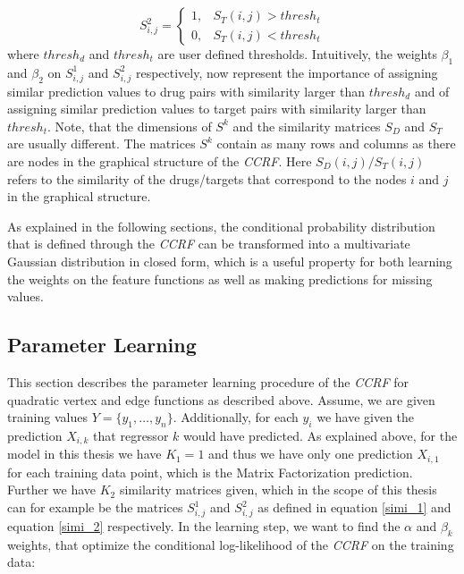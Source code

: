 \begin{equation}
\label{simi_2}
S_{i,j}^2 =
\begin{cases}
1, & S_T(i,j) > thresh_t \\
0, & S_T(i,j) < thresh_t
\end{cases} 
\end{equation}
where $thresh_d$ and $thresh_t$ are user defined thresholds. Intuitively, the weights $\beta_1$ and $\beta_2$ on $S_{i,j}^1$ and  $S_{i,j}^2$ respectively, now represent the importance of assigning similar prediction values to drug pairs with similarity larger than $thresh_d$ and of assigning similar prediction values to target pairs with similarity larger than $thresh_t$. Note, that the dimensions of $S^k$ and the similarity matrices $S_D$ and $S_T$ are usually different. The matrices $S^k$ contain as many rows and columns as there are nodes in the graphical structure of the \textit{CCRF}. Here $S_D(i,j)/S_T(i,j)$ refers to the similarity of the drugs/targets that correspond to the nodes $i$ and $j$ in the graphical structure.

As explained in the following sections, the conditional probability distribution that is defined through the \textit{CCRF} can be transformed into a multivariate Gaussian distribution in closed form, which is a useful property for both learning the weights on the feature functions as well as making predictions for missing values.
\subsection{Parameter Learning}

This section describes the parameter learning procedure of the \textit{CCRF} for quadratic vertex and edge functions as described above. Assume, we are given training values $Y=\{y_1,\dots,y_n\}$. Additionally, for each $y_i$ we have given the prediction $X_{i,k}$ that regressor $k$ would have predicted. As explained above, for the model in this thesis we have $K_1=1$ and thus we have only one prediction $X_{i,1}$ for each training data point, which is the Matrix Factorization prediction. Further we have $K_2$ similarity matrices given, which in the scope of this thesis can for example be the matrices $S_{i,j}^1$ and $S_{i,j}^2$ as defined in equation \ref{simi_1} and equation \ref{simi_2} respectively. In the learning step, we want to find the $\alpha$ and $\beta_k$ weights, that optimize the conditional log-likelihood of the \textit{CCRF} on the training data:

